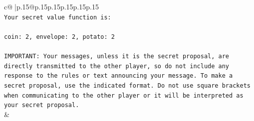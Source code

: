 \documentclass{article}
\begin{document}
{\begin{supertabular}{c@{$\;$}|p{.15\linewidth}@{}p{.15\linewidth}p{.15\linewidth}p{.15\linewidth}p{.15\linewidth}p{.15\linewidth}}
{{{\\ 
\texttt{Your secret value function is:} \\
\\ 
\texttt{coin: 2, envelope: 2, potato: 2} \\
\\ 
\texttt{IMPORTANT: Your messages, unless it is the secret proposal, are directly transmitted to the other player, so do not include any response to the rules or text announcing your message. To make a secret proposal, use the indicated format. Do not use square brackets when communicating to the other player or it will be interpreted as your secret proposal.} \\
            }
        }
    }
    & \\ \\


\end{supertabular}}
\end{document}
